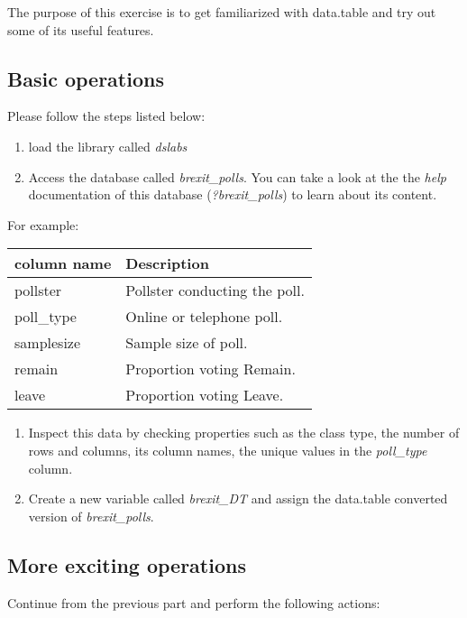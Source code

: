 \documentclass[]{article}
\begin{document}
The purpose of this exercise is to get familiarized with data.table and try out some of its useful features.

\hypertarget{basic-operations}{%
\subsection{Basic operations}\label{basic-operations}}

Please follow the steps listed below:

\begin{enumerate}
\def\labelenumi{\arabic{enumi})}
\item
  load the library called \emph{dslabs}
\item
  Access the database called \emph{brexit\_polls}. You can take a look at the the \emph{help} documentation of this database (\emph{?brexit\_polls}) to learn about its content.
\end{enumerate}

For example:

\begin{longtable}[]{@{}ll@{}}
\toprule
column name & Description\tabularnewline
\midrule
\endhead
pollster & Pollster conducting the poll.\tabularnewline
poll\_type & Online or telephone poll.\tabularnewline
samplesize & Sample size of poll.\tabularnewline
remain & Proportion voting Remain.\tabularnewline
leave & Proportion voting Leave.\tabularnewline
\bottomrule
\end{longtable}

\begin{enumerate}
\def\labelenumi{\arabic{enumi})}
\setcounter{enumi}{2}
\item
  Inspect this data by checking properties such as the class type, the number of rows and columns, its column names, the unique values in the \emph{poll\_type} column.
\item
  Create a new variable called \emph{brexit\_DT} and assign the data.table converted version of \emph{brexit\_polls}.
\end{enumerate}

\hypertarget{more-exciting-operations}{%
\subsection{More exciting operations}\label{more-exciting-operations}}

Continue from the previous part and perform the following actions:
\end{document}
